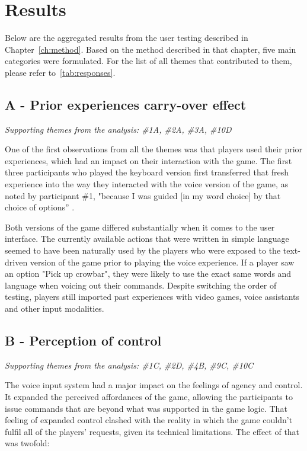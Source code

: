 \chapter{Results}

\label{ch:results}





Below are the aggregated results from the user testing described in Chapter~\ref{ch:method}. 
Based on the method described in that chapter, five main categories were formulated.
For the list of all themes that contributed to them, please refer to~\ref{tab:responses}.

\section{A - Prior experiences carry-over effect}

\textit{Supporting themes from the analysis: \#1A, \#2A, \#3A, \#10D}

One of the first observations from all the themes was that players used their prior experiences, which had an impact on their interaction with the game. The first three participants who played the keyboard version first transferred that fresh experience into the way they interacted with the voice version of the game, as noted by participant \#1, "because I was guided [in my word choice] by that choice of options” .


Both versions of the game differed substantially when it comes to the user interface. 
The currently available actions that were written in simple language seemed to have been naturally used by the players who were exposed to the text-driven version of the game prior to playing the voice experience. If a player saw an option "Pick up crowbar", they were likely to use the exact same words and language when voicing out their commands. 
Despite switching the order of testing, players still imported past experiences with video games, voice assistants and other input modalities. 


\section{B - Perception of control}

\textit{Supporting themes from the analysis: \#1C, \#2D, \#4B, \#9C, \#10C}


The voice input system had a major impact on the feelings of agency and control. 
It expanded the perceived affordances of the game, allowing the participants to issue commands that are beyond what was supported in the game logic.
That feeling of expanded control clashed with the reality in which the game couldn't fulfil all of the players' requests, given its technical limitations. The effect of that was twofold:

